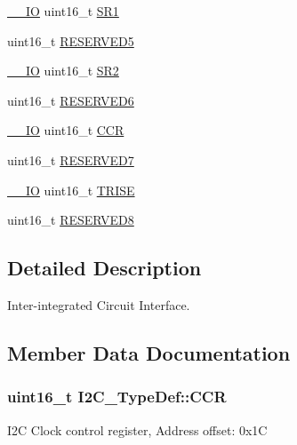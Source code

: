 \begin{DoxyCompactItemize}
\item 
\hyperlink{core__cm4_8h_aec43007d9998a0a0e01faede4133d6be}{\+\_\+\+\_\+\+IO} uint16\+\_\+t \hyperlink{struct_i2_c___type_def_ae1602cd1c9cad449523099c97138f991}{S\+R1}
\item 
uint16\+\_\+t \hyperlink{struct_i2_c___type_def_ae736412dcff4daa38bfa8bf8628df316}{R\+E\+S\+E\+R\+V\+E\+D5}
\item 
\hyperlink{core__cm4_8h_aec43007d9998a0a0e01faede4133d6be}{\+\_\+\+\_\+\+IO} uint16\+\_\+t \hyperlink{struct_i2_c___type_def_a95c7f729b10eb2acafe499d9c9a81a83}{S\+R2}
\item 
uint16\+\_\+t \hyperlink{struct_i2_c___type_def_aaf1b319262f53669f49e244d94955a60}{R\+E\+S\+E\+R\+V\+E\+D6}
\item 
\hyperlink{core__cm4_8h_aec43007d9998a0a0e01faede4133d6be}{\+\_\+\+\_\+\+IO} uint16\+\_\+t \hyperlink{struct_i2_c___type_def_a1775e779008da2b4d1807c2b5033b8a5}{C\+CR}
\item 
uint16\+\_\+t \hyperlink{struct_i2_c___type_def_a0f398bdcc3f24e7547c3cb9343111fd0}{R\+E\+S\+E\+R\+V\+E\+D7}
\item 
\hyperlink{core__cm4_8h_aec43007d9998a0a0e01faede4133d6be}{\+\_\+\+\_\+\+IO} uint16\+\_\+t \hyperlink{struct_i2_c___type_def_aaba7a808e4dfae5cc06b197c298af206}{T\+R\+I\+SE}
\item 
uint16\+\_\+t \hyperlink{struct_i2_c___type_def_a6e762751c9d5a1e41efb6033a26d8ed8}{R\+E\+S\+E\+R\+V\+E\+D8}
\end{DoxyCompactItemize}


\subsection{Detailed Description}
Inter-\/integrated Circuit Interface. 

\subsection{Member Data Documentation}
\subsubsection[{\texorpdfstring{C\+CR}{CCR}}]{ uint16\+\_\+t I2\+C\+\_\+\+Type\+Def\+::\+C\+CR}\hypertarget{struct_i2_c___type_def_a1775e779008da2b4d1807c2b5033b8a5}{}\label{struct_i2_c___type_def_a1775e779008da2b4d1807c2b5033b8a5}
I2C Clock control register, Address offset\+: 0x1C 
